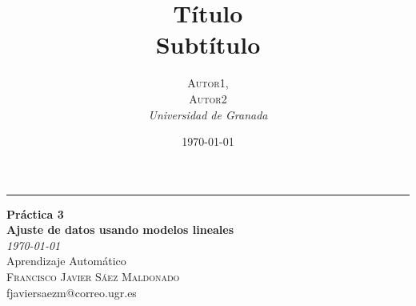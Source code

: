 \documentclass[a4paper, 20pt]{article}
\title{\textbf{Título}\\ %
Subtítulo} %
\author{\textsc{Autor1,\\Autor2} %
\\{\textit{Universidad de Granada}}} %
\date{\today} %
\begin{document}

\begin{titlepage} %
	
	\raggedleft %
	
	\rule{1pt}{\textheight} %
	\hspace{0.05\textwidth} %
	\parbox[b]{0.8\textwidth}{ %
		
		{\Huge\bfseries Práctica 3\\[0.5\baselineskip]\large Ajuste de datos usando modelos lineales\\[2\baselineskip]} %
		{\large\textit{\today}\\[0.5\baselineskip]Aprendizaje Automático\\[1.5\baselineskip] }%
		{\Large\textsc{Francisco Javier Sáez Maldonado}\\[0.5\baselineskip]fjaviersaezm@correo.ugr.es} %
		
		\vspace{0.4\textheight} %
		
		{\noindent \\[0.5\baselineskip] }\\[\baselineskip] %
	}

\end{titlepage}




{\parskip=2pt
  \tableofcontents
}
\pagebreak
\end{document}

